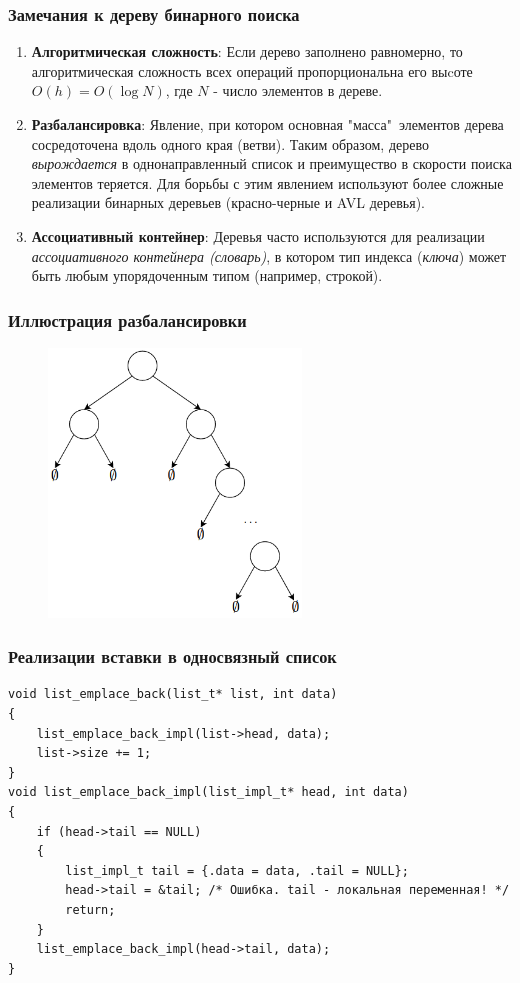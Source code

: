 \documentclass{beamer}
\begin{document}
    \begin{frame}[fragile]
        \frametitle{Замечания к дереву бинарного поиска}
        \begin{enumerate}
            \justifying
            \item {\bf Алгоритмическая сложность}:
            Если дерево заполнено равномерно, то алгоритмическая сложность всех операций пропорциональна его выcоте $O(h) = O(\log N)$, где $N$ - число элементов в дереве.
            \item {\bf Разбалансировка}:
            Явление, при котором основная "масса"\ элементов дерева сосредоточена вдоль одного края (ветви). Таким образом, дерево {\it вырождается} в однонаправленный список и преимущество в скорости поиска элементов теряется. Для борьбы с этим явлением используют более сложные реализации бинарных деревьев (красно-черные и AVL деревья).
            \item {\bf Ассоциативный контейнер}:
            Деревья часто используются для реализации {\it ассоциативного контейнера (словарь)}, в котором тип индекса ({\it ключа}) может быть любым упорядоченным типом (например, строкой).
        \end{enumerate}
    \end{frame}
    \begin{frame}[fragile]
        \frametitle{Иллюстрация разбалансировки}
        \begin{figure}[!tbp]
           \centering
           \includegraphics[width=0.6\textwidth]{pics/inbalance.png}
        \end{figure}
    \end{frame}
    \begin{frame}[fragile]
        \frametitle{Реализации вставки в односвязный список}
        \begin{verbatim}
void list_emplace_back(list_t* list, int data)
{
    list_emplace_back_impl(list->head, data);
    list->size += 1;
}
void list_emplace_back_impl(list_impl_t* head, int data)
{
    if (head->tail == NULL)
    {
        list_impl_t tail = {.data = data, .tail = NULL};
        head->tail = &tail; /* Ошибка. tail - локальная переменная! */
        return;
    }
    list_emplace_back_impl(head->tail, data);
}
        \end{verbatim}
    \end{frame}
\end{document}
